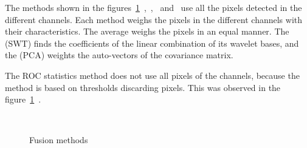 \documentclass[conference]{IEEEtran}
\begin{document}
The methods shown in the figures~\ref{fusion_met}~,~,~ and~ use all the pixels detected in the different channels. Each method weighs the pixels in the different channels with their characteristics. The average weighs the pixels in an equal manner. The (SWT) finds the coefficients of the linear combination of its wavelet bases, and the (PCA) weights the auto-vectors of the covariance matrix.

The ROC statistics method does not use all pixels of the channels, because the method is based on thresholds discarding pixels. This was observed in the figure~\ref{fusion_met}~.

\begin{figure}[!ht]
     \hfill
     \\
     \hfill
     \caption{Fusion methods}
     \label{fusion_met}
   \end{figure}
\end{document}
